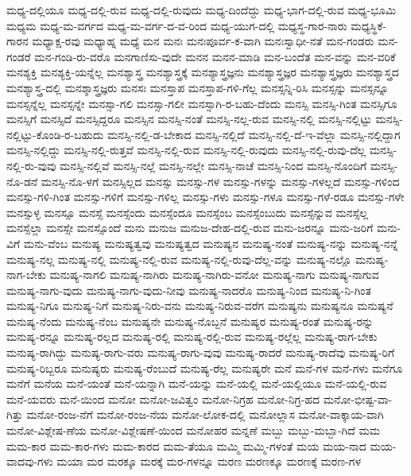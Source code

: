 {ಮಧ್ಯ-ದಲ್ಲಿಯೂ
ಮಧ್ಯ-ದಲ್ಲಿ-ರುವ
ಮಧ್ಯ-ದಲ್ಲಿ-ರುವುದು
ಮಧ್ಯ-ದಿಂದೆದ್ದು
ಮಧ್ಯ-ಭಾಗ-ದಲ್ಲಿ-ರುವ
ಮಧ್ಯ-ಭೂಮಿ
ಮಧ್ಯಮ
ಮಧ್ಯ-ಮ-ವರ್ಗದ
ಮಧ್ಯ-ಮ-ವರ್ಗ-ದ-ವ-ರಿಂದ
ಮಧ್ಯ-ಯುಗ-ದಲ್ಲಿ
ಮಧ್ಯಸ್ಥ-ಗಾರ-ನಾರು
ಮಧ್ಯಸ್ಥಿಕೆ-ಗಾರನ
ಮಧ್ಯಾಕ್ಷ-ರವು
ಮಧ್ಯಾಹ್ನ
ಮಧ್ಯೆ
ಮನ
ಮನಃ
ಮನಃಪೂರ್ವ-ಕ-ವಾಗಿ
ಮನಃಸ್ವಾಧೀ-ನತೆ
ಮನ-ಗಂಡರು
ಮನ-ಗಂಡರೆ
ಮನ-ಗಂಡಿ-ರು-ವರೊ
ಮನಗಾಣಿಸು-ವುದೇ
ಮನನ
ಮನನ-ಮಾಡಿ
ಮನ-ಬಂದೆತ
ಮನ-ವನ್ನು
ಮನ-ವರಿಕೆ
ಮನಶ್ಯಕ್ತಿ
ಮನಶ್ಯಕ್ತಿ-ಯನ್ನೆಲ್ಲ
ಮನಶ್ಯಾಸ್ತ್ರ
ಮನಶ್ಯಾಸ್ತ್ರಕ್ಕೆ
ಮನಶ್ಯಾಸ್ತ್ರಜ್ಞನು
ಮನಶ್ಯಾಸ್ತ್ರಜ್ಞರ
ಮನಶ್ಯಾಸ್ತ್ರಜ್ಞರು
ಮನಶ್ಯಾಸ್ತ್ರದ
ಮನಶ್ಯಾಸ್ತ್ರ-ದಲ್ಲಿ
ಮನಶ್ಶಾಸ್ತ್ರಜ್ಞರು
ಮನಸಃ
ಮನಸ್ತಾಪ
ಮನಸ್ತಾಪ-ಗಳಿ-ಗೆಲ್ಲ
ಮನಸ್ಸನ್ನಿ-ರಿಸಿ
ಮನಸ್ಸನ್ನು
ಮನಸ್ಸನ್ನೂ
ಮನಸ್ಸನ್ನೆಲ್ಲ
ಮನಸ್ಸನ್ನೇ
ಮನಸ್ಸಾ-ಗಲಿ
ಮನಸ್ಸಾ-ಗಲೀ
ಮನಸ್ಸಾಗಿ-ರ-ಬಹು-ದೆಂದು
ಮನಸ್ಸಿ
ಮನಸ್ಸಿ-ಗಿಂತ
ಮನಸ್ಸಿಗೂ
ಮನಸ್ಸಿಗೆ
ಮನಸ್ಸಿದೆ
ಮನಸ್ಸಿದ್ದರೂ
ಮನಸ್ಸಿನ
ಮನಸ್ಸಿ-ನಂತೆ
ಮನಸ್ಸಿ-ನಲ್ಲ-ರುವ
ಮನಸ್ಸಿ-ನಲ್ಲಿ
ಮನಸ್ಸಿ-ನಲ್ಲಿಟ್ಟು
ಮನಸ್ಸಿ-ನಲ್ಲಿಟ್ಟು-ಕೊಂಡಿ-ರ-ಬಹುದು
ಮನಸ್ಸಿ-ನಲ್ಲಿ-ಡ-ಬೇಕಾದ
ಮನಸ್ಸಿ-ನಲ್ಲಿದೆ
ಮನಸ್ಸಿ-ನಲ್ಲಿ-ದೆ-ಇ-ವೆಲ್ಲಾ
ಮನಸ್ಸಿ-ನಲ್ಲಿದ್ದಾಗ
ಮನಸ್ಸಿ-ನಲ್ಲಿದ್ದು
ಮನಸ್ಸಿ-ನಲ್ಲಿ-ರುತ್ತವೆ
ಮನಸ್ಸಿ-ನಲ್ಲಿ-ರುವ
ಮನಸ್ಸಿ-ನಲ್ಲಿ-ರುವುದು
ಮನಸ್ಸಿ-ನಲ್ಲಿ-ರುವು-ದೆಲ್ಲ
ಮನಸ್ಸಿ-ನಲ್ಲಿ-ರು-ವುವು
ಮನಸ್ಸಿ-ನಲ್ಲಿವೆ
ಮನಸ್ಸಿ-ನಲ್ಲೆ
ಮನಸ್ಸಿ-ನಲ್ಲೇ
ಮನಸ್ಸಿ-ನಾಚೆ
ಮನಸ್ಸಿ-ನಿಂದ
ಮನಸ್ಸಿ-ನೊಂದಿಗೆ
ಮನಸ್ಸಿ-ನೊ-ಡನೆ
ಮನಸ್ಸಿ-ನೊ-ಳಗೆ
ಮನಸ್ಸಿಲ್ಲದ
ಮನಸ್ಸು
ಮನಸ್ಸು-ಗಳ
ಮನಸ್ಸು-ಗಳನ್ನು
ಮನಸ್ಸು-ಗಳಲ್ಲದೆ
ಮನಸ್ಸು-ಗಳಿಂದ
ಮನಸ್ಸು-ಗಳಿ-ಗಿಂತ
ಮನಸ್ಸು-ಗಳಿಗೆ
ಮನಸ್ಸು-ಗಳಿಲ್ಲ
ಮನಸ್ಸು-ಗಳು
ಮನಸ್ಸು-ಗಳೂ
ಮನಸ್ಸು-ಗಳೆ-ರಡೂ
ಮನಸ್ಸು-ಗಳೇ
ಮನಸ್ಸುಳ್ಳ
ಮನಸ್ಸೂ
ಮನಸ್ಸೆ
ಮನಸ್ಸೆಂದು
ಮನಸ್ಸೆಂದೂ
ಮನಸ್ಸೆಂಬ
ಮನಸ್ಸೆಂಬುದು
ಮನಸ್ಸೆನ್ನುವ
ಮನಸ್ಸೆಲ್ಲ
ಮನಸ್ಸೆಲ್ಲಾ
ಮನಸ್ಸೇ
ಮನಸ್ಸೊಂದೆ
ಮನು
ಮನುಜ
ಮನುಜ-ದೇಹ-ದಲ್ಲಿ-ರುವ
ಮನು-ಜರನ್ನೂ
ಮನು-ಜರಿಗೆ
ಮನು-ವಿಗೆ
ಮನು-ವೆಂಬ
ಮನುಷ್ಯ
ಮನುಷ್ಯತ್ವವು
ಮನುಷ್ಯತ್ವದ
ಮನುಷ್ಯನ
ಮನುಷ್ಯ-ನಂತೆ
ಮನುಷ್ಯ-ನನ್ನು
ಮನುಷ್ಯ-ನನ್ನೆ
ಮನುಷ್ಯ-ನಲ್ಲ
ಮನುಷ್ಯ-ನಲ್ಲಿ
ಮನುಷ್ಯ-ನಲ್ಲಿ-ರುವ
ಮನುಷ್ಯ-ನಲ್ಲಿ-ರುವು-ದೆಲ್ಲ-ವನ್ನು
ಮನುಷ್ಯ-ನಲ್ಲೊ
ಮನುಷ್ಯ-ನಾಗ-ಬೇಕು
ಮನುಷ್ಯ-ನಾಗಲಿ
ಮನುಷ್ಯ-ನಾಗಿರು
ಮನುಷ್ಯ-ನಾಗಿರು-ವನೋ
ಮನುಷ್ಯ-ನಾಗು
ಮನುಷ್ಯ-ನಾಗುವ
ಮನುಷ್ಯ-ನಾಗು-ವುದು
ಮನುಷ್ಯ-ನಾಗು-ವುದು-ನೀವು
ಮನುಷ್ಯ-ನಾದರೊ
ಮನುಷ್ಯ-ನಿಂದ
ಮನುಷ್ಯ-ನಿ-ಗಿಂತ
ಮನುಷ್ಯ-ನಿಗೂ
ಮನುಷ್ಯ-ನಿಗೆ
ಮನುಷ್ಯ-ನಿರು-ವನು
ಮನುಷ್ಯ-ನಿರುವ-ವರೆಗ
ಮನುಷ್ಯನು
ಮನುಷ್ಯನೂ
ಮನುಷ್ಯನೆ
ಮನುಷ್ಯ-ನೆಂದು
ಮನುಷ್ಯ-ನೆಂಬ
ಮನುಷ್ಯನೇ
ಮನುಷ್ಯ-ನೊಬ್ಬನೆ
ಮನುಷ್ಯರ
ಮನುಷ್ಯ-ರಂತೆ
ಮನುಷ್ಯ-ರನ್ನು
ಮನುಷ್ಯ-ರನ್ನೂ
ಮನುಷ್ಯ-ರಲ್ಲದ
ಮನುಷ್ಯ-ರಲ್ಲಿ
ಮನುಷ್ಯ-ರಲ್ಲಿ-ರುವ
ಮನುಷ್ಯ-ರಲ್ಲೆಲ್ಲ
ಮನುಷ್ಯ-ರಾಗ-ಬೇಕು
ಮನುಷ್ಯ-ರಾಗಿದ್ದು
ಮನುಷ್ಯ-ರಾಗು-ವರು
ಮನುಷ್ಯ-ರಾಗು-ವುವು
ಮನುಷ್ಯ-ರಾದರೆ
ಮನುಷ್ಯ-ರಾದೆವು
ಮನುಷ್ಯ-ರಿಗೆ
ಮನುಷ್ಯ-ರಿಬ್ಬರೂ
ಮನುಷ್ಯರು
ಮನುಷ್ಯ-ರೆಂಬುದೆ
ಮನುಷ್ಯ-ರೆಲ್ಲ
ಮನುಷ್ಯರೇ
ಮನೆ
ಮನೆ-ಗಳ
ಮನೆ-ಗಳು
ಮನೆಗೂ
ಮನೆಗೆ
ಮನೆಯ
ಮನೆ-ಯಂತೆ
ಮನೆ-ಯನ್ನಾಗಿ
ಮನೆ-ಯನ್ನು
ಮನೆ-ಯಲ್ಲಿ
ಮನೆ-ಯಲ್ಲಿಯೂ
ಮನೆ-ಯಲ್ಲಿ-ರುವ
ಮನೆ-ಯವರು
ಮನೆ-ಯಿಂದ
ಮನೋ
ಮನೋ-ಜವಿತ್ವಂ
ಮನೋ-ನಿಗ್ರಹ
ಮನೋ-ನಿಗ್ರ-ಹದ
ಮನೋ-ಭೀಷ್ಟ-ವಾ-ಗಿತ್ತು
ಮನೋ-ರಂಜ-ನೆಗೆ
ಮನೋ-ರಂಜ-ನೆಯ
ಮನೋ-ಲೋಕ-ದಲ್ಲಿ
ಮನೋಲ್ಲಾಸ
ಮನೋ-ವಾಕ್ಕಾಯ-ವಾಗಿ
ಮನೋ-ವಿಶ್ಲೇಷ-ಣೆಯ
ಮನೋ-ವಿಶ್ಲೇಷಣೆ-ಯಿಂದ
ಮನೋಹರ
ಮನ್ನಣೆ
ಮಬ್ಬು
ಮಬ್ಬು-ಮಬ್ಬಾ-ಗಿದೆ
ಮಮ
ಮಮ-ಕಾರ
ಮಮ-ಕಾರ-ಗಳು
ಮಮ-ಕಾರದ
ಮಮ-ತೆಯೂ
ಮಮ್ಮಿ
ಮಮ್ಮಿ-ಗಳಂತೆ
ಮಯ
ಮಯ-ನಾದ
ಮಯ-ವಾದವು-ಗಳು
ಮಯಾ
ಮರ
ಮರಕ್ಕೂ
ಮರಕ್ಕೆ
ಮರ-ಗಳನ್ನೂ
ಮರಣ
ಮರಣಕ್ಕೂ
ಮರಣಕ್ಕೆ
ಮರಣ-ಗಳ
}
